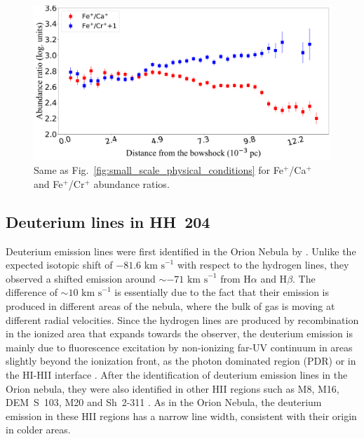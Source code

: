 \documentclass[twocolumn]{aastex63}
\begin{document}
\begin{figure}
\centering
\includegraphics[width=\columnwidth]{Ca_Cr_Fe_ionic_ratios_distribution.pdf}
\caption{Same as Fig.~\ref{fig:small_scale_physical_conditions} for Fe$^{+}$/Ca$^{+}$ and Fe$^{+}$/Cr$^{+}$ abundance ratios.}
\label{fig:Ca_Cr_Fe_abundance_ratios}
\end{figure}

\subsection{Deuterium lines in HH~204}
\label{subsec:deuterium}


Deuterium emission lines were first identified in the Orion Nebula by \citet[][]{hebrard00a}. Unlike the expected isotopic shift of $-81.6 \text{ km s}^{-1}$ with respect to the hydrogen lines, they observed a shifted emission around $\sim -71 \text{ km s}^{-1}$ from H$\alpha$ and H$\beta$. The difference of $\sim 10 \text{ km s}^{-1}$ is essentially due to the fact that their emission is produced in different areas of the nebula, where the bulk of gas is moving at different radial velocities. Since the hydrogen lines are produced by recombination in the ionized area that expands towards the observer, the deuterium emission is  mainly due to fluorescence excitation by non-ionizing far-UV continuum in areas slightly beyond the ionization front, as the photon dominated region (PDR) or in the H\thinspace I-H\thinspace II interface \citep[][]{odell01_deu}. After the identification of deuterium emission lines in the Orion nebula, they were also identified in other H\thinspace II regions such as M8, M16, DEM~S~103, M20 and Sh~2-311 \citep[][]{hebrard00b,garciarojas05,garciarojas06,garciarojas07-2}. As in the Orion Nebula, the deuterium emission in these H\thinspace II regions has a narrow line width, consistent with their origin in colder areas.
\end{document}
